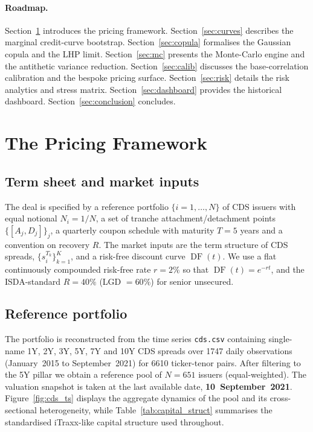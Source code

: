 \documentclass[11pt,a4paper]{article}
\newcommand{\1}{\mathbf{1}}
\DeclareMathOperator{\DF}{DF}
\begin{document}
\paragraph{Roadmap.}
Section~\ref{sec:framework} introduces the pricing framework.
Section~\ref{sec:curves} describes the marginal credit-curve bootstrap.
Section~\ref{sec:copula} formalises the Gaussian copula and the LHP
limit. Section~\ref{sec:mc} presents the Monte-Carlo engine and the
antithetic variance reduction. Section~\ref{sec:calib} discusses the
base-correlation calibration and the bespoke pricing surface.
Section~\ref{sec:risk} details the risk analytics and stress matrix.
Section~\ref{sec:dashboard} provides the historical dashboard.
Section~\ref{sec:conclusion} concludes.

\section{The Pricing Framework}\label{sec:framework}

\subsection{Term sheet and market inputs}
The deal is specified by a reference portfolio
\(\{i=1,\dots,N\}\) of CDS issuers with equal notional
\(N_{i}=1/N\), a set of tranche attachment/detachment points
\(\{[A_{j},D_{j}]\}_{j}\), a quarterly coupon schedule with maturity
\(T=5\) years and a convention on recovery
\(R\). The market inputs are the term structure of CDS spreads,
\(\{s_{i}^{T_{k}}\}_{k=1}^{K}\), and a risk-free discount curve
\(\DF(t)\). We use a flat continuously compounded risk-free rate
\(r=2\%\) so that \(\DF(t)=e^{-rt}\), and the ISDA-standard
\(R=40\%\) (LGD \(=60\%\)) for senior unsecured.

\subsection{Reference portfolio}\label{ssec:portfolio}
The portfolio is reconstructed from the time series
\texttt{cds.csv} containing single-name 1Y, 2Y, 3Y, 5Y, 7Y and 10Y CDS
spreads over 1747 daily observations (January~2015 to September~2021)
for 6610 ticker-tenor pairs. After filtering to the 5Y pillar we
obtain a reference pool of \(N=651\) issuers (equal-weighted). The
valuation snapshot is taken at the last available date,
\textbf{10~September~2021}.
Figure~\ref{fig:cds_ts} displays the aggregate dynamics of the pool and
its cross-sectional heterogeneity, while Table~\ref{tab:capital_struct}
summarises the standardised iTraxx-like capital structure used throughout.
\end{document}
